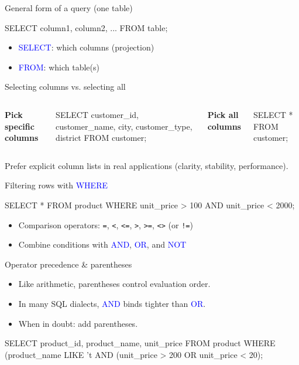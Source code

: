 \documentclass[10pt,aspectratio=169]{beamer}
\newcommand{\sqlk}[1]{\textcolor{blue}{#1}}
\begin{document}
\begin{frame}[fragile]{General form of a query (one table)}
\begin{codesql}
SELECT column1, column2, ...
FROM   table;
\end{codesql}
\vspace{0.8em}
\begin{itemize}
  \item \sqlk{SELECT}: which columns (projection)
  \item \sqlk{FROM}: which table(s)
\end{itemize}
\end{frame}

\begin{frame}[fragile]{Selecting columns vs. selecting all}
\begin{columns}[T,onlytextwidth]
\textbf{Pick specific columns}
\begin{codesql}
SELECT customer_id, customer_name, city, customer_type, district
FROM   customer;
\end{codesql}
\textbf{Pick all columns}
\begin{codesql}
SELECT *
FROM   customer;
\end{codesql}
\end{columns}
\vspace{0.6em}
\small Prefer explicit column lists in real applications (clarity, stability, performance).
\end{frame}

\begin{frame}[fragile]{Filtering rows with \sqlk{WHERE}}
\begin{codesql}
SELECT *
FROM   product
WHERE  unit_price > 100
  AND  unit_price < 2000;
\end{codesql}
\vspace{0.6em}
\begin{itemize}
  \item Comparison operators: \texttt{=}, \texttt{<}, \texttt{<=}, \texttt{>}, \texttt{>=}, \texttt{<>} (or \texttt{!=})
  \item Combine conditions with \sqlk{AND}, \sqlk{OR}, and \sqlk{NOT}
\end{itemize}
\end{frame}

\begin{frame}[fragile]{Operator precedence \& parentheses}
\begin{itemize}
  \item Like arithmetic, parentheses control evaluation order.
  \item In many SQL dialects, \sqlk{AND} binds tighter than \sqlk{OR}.
  \item When in doubt: add parentheses.
\end{itemize}
\vspace{0.6em}
\begin{codesql}
SELECT product_id, product_name, unit_price
FROM   product
WHERE (product_name LIKE 't%
  AND (unit_price > 200 OR unit_price < 20);
\end{codesql}
\end{frame}
\end{document}
